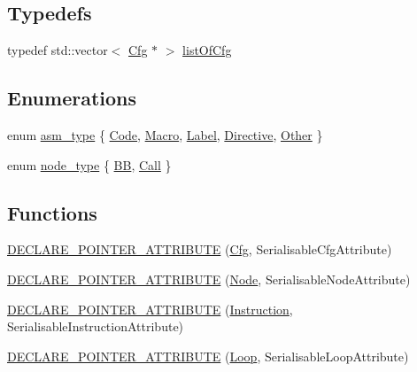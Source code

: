 \subsection*{Typedefs}
\begin{DoxyCompactItemize}
\item 
typedef std\+::vector$<$ \hyperlink{classcfglib_1_1Cfg}{Cfg} $\ast$ $>$ \hyperlink{namespacecfglib_a6d40ca49d73d6bd01cf38af88645373a}{list\+Of\+Cfg}
\end{DoxyCompactItemize}
\subsection*{Enumerations}
\begin{DoxyCompactItemize}
\item 
enum \hyperlink{namespacecfglib_a5ae32d51cf4ff1db5485367eab63a500}{asm\+\_\+type} \{ \newline
\hyperlink{namespacecfglib_a5ae32d51cf4ff1db5485367eab63a500aa7e96574bfbd440b6e5f3456ddfa210b}{Code}, 
\hyperlink{namespacecfglib_a5ae32d51cf4ff1db5485367eab63a500ab543967d43c6ff5aa8f56eb6c009bae9}{Macro}, 
\hyperlink{namespacecfglib_a5ae32d51cf4ff1db5485367eab63a500a577872b885c2aa4521dd22602388c14b}{Label}, 
\hyperlink{namespacecfglib_a5ae32d51cf4ff1db5485367eab63a500a7738f89d7782c04c2a72cfe319c35ec4}{Directive}, 
\newline
\hyperlink{namespacecfglib_a5ae32d51cf4ff1db5485367eab63a500a761aa3860065845e85493863a83bea12}{Other}
 \}
\item 
enum \hyperlink{namespacecfglib_a44952a45d827aaa271f7e7dac5bf7752}{node\+\_\+type} \{ \hyperlink{namespacecfglib_a44952a45d827aaa271f7e7dac5bf7752a161e598b1ef5f29fc67972d96fbc784d}{BB}, 
\hyperlink{namespacecfglib_a44952a45d827aaa271f7e7dac5bf7752a149dfeb27580a7821420112c9a02a05e}{Call}
 \}
\end{DoxyCompactItemize}
\subsection*{Functions}
\begin{DoxyCompactItemize}
\item 
\hyperlink{namespacecfglib_a674d879c9644754a4e9820440641977b}{D\+E\+C\+L\+A\+R\+E\+\_\+\+P\+O\+I\+N\+T\+E\+R\+\_\+\+A\+T\+T\+R\+I\+B\+U\+TE} (\hyperlink{classcfglib_1_1Cfg}{Cfg}, Serialisable\+Cfg\+Attribute)
\item 
\hyperlink{namespacecfglib_a038b2798913adc88f5623acf2261207c}{D\+E\+C\+L\+A\+R\+E\+\_\+\+P\+O\+I\+N\+T\+E\+R\+\_\+\+A\+T\+T\+R\+I\+B\+U\+TE} (\hyperlink{classcfglib_1_1Node}{Node}, Serialisable\+Node\+Attribute)
\item 
\hyperlink{namespacecfglib_ae1d9aa724c879eb22db67a293ba5ecff}{D\+E\+C\+L\+A\+R\+E\+\_\+\+P\+O\+I\+N\+T\+E\+R\+\_\+\+A\+T\+T\+R\+I\+B\+U\+TE} (\hyperlink{classcfglib_1_1Instruction}{Instruction}, Serialisable\+Instruction\+Attribute)
\item 
\hyperlink{namespacecfglib_a622bb8d82c94f225ccedeab63dbe0ad2}{D\+E\+C\+L\+A\+R\+E\+\_\+\+P\+O\+I\+N\+T\+E\+R\+\_\+\+A\+T\+T\+R\+I\+B\+U\+TE} (\hyperlink{classcfglib_1_1Loop}{Loop}, Serialisable\+Loop\+Attribute)
\end{DoxyCompactItemize}


